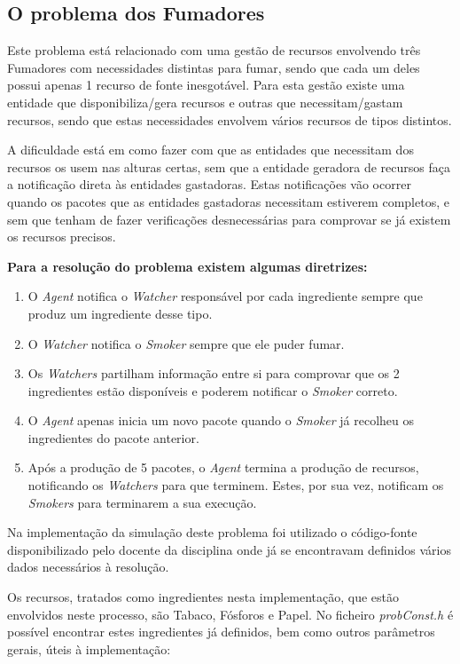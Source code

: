 \documentclass[10pt,portuguese]{article}
\begin{document}
\clearpage

\subsection{O problema dos Fumadores}

\par Este problema está relacionado com uma gestão de recursos envolvendo três Fumadores com necessidades distintas para fumar, sendo que cada um deles possui apenas 1 recurso de fonte inesgotável. Para esta gestão existe uma entidade que disponibiliza/gera recursos e outras que necessitam/gastam recursos, sendo que estas necessidades envolvem vários recursos de tipos distintos. 
\par A dificuldade está em como fazer com que as entidades que necessitam dos recursos os usem nas alturas certas, sem que a entidade geradora de recursos faça a notificação direta às entidades gastadoras. Estas notificações vão ocorrer quando os pacotes que as entidades gastadoras necessitam estiverem completos, e sem que tenham de fazer verificações desnecessárias para comprovar se já existem os recursos precisos.
\par \textbf{Para a resolução do problema existem algumas diretrizes:}
\begin{enumerate}
  \item O \textit{Agent} notifica o \textit{Watcher} responsável por cada ingrediente sempre que produz um ingrediente desse tipo.
  \item O \textit{Watcher} notifica o \textit{Smoker} sempre que ele puder fumar.
  \item Os \textit{Watchers} partilham informação entre si para comprovar que os 2 ingredientes estão disponíveis e poderem notificar o \textit{Smoker} correto.
  \item O \textit{Agent} apenas inicia um novo pacote quando o \textit{Smoker} já recolheu os ingredientes do pacote anterior.
  \item Após a produção de 5 pacotes, o \textit{Agent} termina a produção de recursos, notificando os \textit{Watchers} para que terminem. Estes, por sua vez, notificam os \textit{Smokers} para terminarem a sua execução.
\end{enumerate}
\par Na implementação da simulação deste problema foi utilizado o código-fonte disponibilizado pelo docente da disciplina onde já se encontravam definidos vários dados necessários à resolução.

\par Os recursos, tratados como ingredientes nesta implementação, que estão envolvidos neste processo, são Tabaco, Fósforos e Papel. No ficheiro \textit{probConst.h} é possível encontrar estes ingredientes já definidos, bem como outros parâmetros gerais, úteis à implementação:
\end{document}
